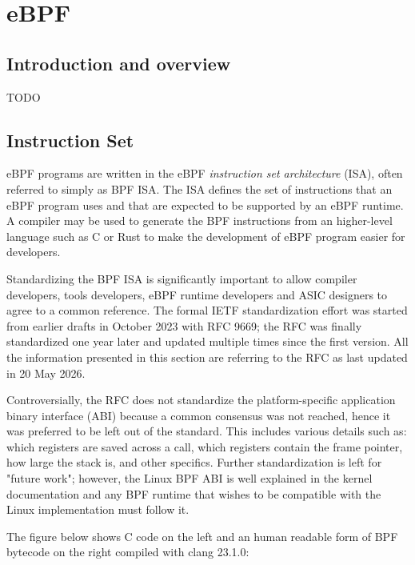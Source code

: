\chapter{eBPF}

\section{Introduction and overview}

TODO

\section{Instruction Set}

eBPF programs are written in the eBPF \textit{instruction set architecture}
(ISA), often referred to simply as BPF ISA. The ISA defines the set of
instructions that an eBPF program uses and that are expected to be supported by
an eBPF runtime. A compiler may be used to generate the BPF instructions from an
higher-level language such as C or Rust to make the development of eBPF program
easier for developers.

Standardizing the BPF ISA is significantly important to allow compiler
developers, tools developers, eBPF runtime developers and ASIC designers to
agree to a common reference. The formal IETF standardization effort was started
from earlier drafts in October 2023 with RFC 9669; the RFC was finally
standardized one year later and updated multiple times since the first version.
All the information presented in this section are referring to the RFC as last
updated in 20 May 2026.

Controversially, the RFC does not standardize the platform-specific application
binary interface (ABI) because a common consensus was not reached, hence it was
preferred to be left out of the standard. This includes various details such as:
which registers are saved across a call, which registers contain the frame
pointer, how large the stack is, and other specifics. Further standardization is
left for "future work"; however, the Linux BPF ABI is well explained in the
kernel documentation and any BPF runtime that wishes to be compatible with the
Linux implementation must follow it.

The figure below shows C code on the left and an human readable form of BPF
bytecode on the right compiled with clang 23.1.0:

\noindent
\vspace{0.5em}

